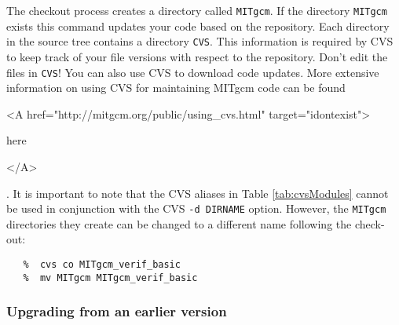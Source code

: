The checkout process creates a directory called \texttt{MITgcm}. If
the directory \texttt{MITgcm} exists this command updates your code
based on the repository. Each directory in the source tree contains a
directory \texttt{CVS}. This information is required by CVS to keep
track of your file versions with respect to the repository. Don't edit
the files in \texttt{CVS}!  You can also use CVS to download code
updates.  More extensive information on using CVS for maintaining
MITgcm code can be found
\begin{rawhtml} <A href="http://mitgcm.org/public/using_cvs.html" target="idontexist"> \end{rawhtml}
here
\begin{rawhtml} </A> \end{rawhtml} 
.
It is important to note that the CVS aliases in Table
\ref{tab:cvsModules} cannot be used in conjunction with the CVS
\texttt{-d DIRNAME} option.  However, the \texttt{MITgcm} directories
they create can be changed to a different name following the check-out:
\begin{verbatim}
   %  cvs co MITgcm_verif_basic
   %  mv MITgcm MITgcm_verif_basic
\end{verbatim}

\subsubsection{Upgrading from an earlier version}

